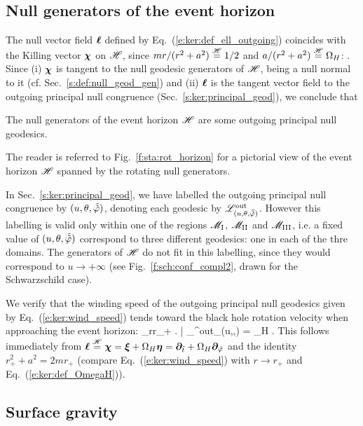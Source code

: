 \subsection{Null generators of the event horizon}

The null vector field $\bm{\ell}$ defined by Eq.~(\ref{e:ker:def_ell_outgoing}) coincides with the Killing vector $\bm{\chi}$ on $\mathscr{H}$,
since $m r/(r^2 + a^2) \stackrel{\mathscr{H}}{=} 1/2$ and $a/(r^2+a^2) \stackrel{\mathscr{H}}{=} \Omega_H$:
\be \label{e:ker:l_eqH_chi}
    \wl \equalH \w{\chi} .
\ee
Since (i) $\bm{\chi}$ is tangent
to the null geodesic generators of $\mathscr{H}$, being a null normal to it (cf. Sec.~\ref{s:def:null_geod_gen}) and (ii) $\bm{\ell}$ is the tangent vector field to the
outgoing principal null congruence (Sec.~\ref{s:ker:principal_geod}),
we conclude that
\begin{greybox}
The null generators of the event horizon $\mathscr{H}$ are some outgoing principal
null geodesics.
\end{greybox}
The reader is referred to Fig.~\ref{f:sta:rot_horizon} for a pictorial
view of the event horizon $\mathscr{H}$ spanned by the rotating null generators.

\begin{remark}
In Sec.~\ref{s:ker:principal_geod}, we have labelled the outgoing principal
null congruence by $(u,\theta,\tilde{{\tilde\varphi}})$, denoting each geodesic by
$\mathscr{L}^{\rm out}_{(u,\theta,\tilde{{\tilde\varphi}})}$. However this labelling is valid
only within one of the regions $\mathscr{M}_{\rm I}$, $\mathscr{M}_{\rm II}$ and
$\mathscr{M}_{\rm III}$, i.e. a fixed value of $(u,\theta,\tilde{{\tilde\varphi}})$
correspond to three different geodesics: one in each of the thre domains.
The generators of $\mathscr{H}$ do not fit in this labelling, since they would
correspond to $u\rightarrow +\infty$ (see Fig.~\ref{f:sch:conf_compl2}, drawn
for the Schwarzschild case).
\end{remark}


We verify that the winding speed of the outgoing principal
null geodesics given by Eq.~(\ref{e:ker:wind_speed}) tends toward
the black hole rotation velocity when approaching the event horizon:
\be
    \lim_{r\rightarrow r_+}
    \left. \frac{\D\tph}{\D\ti} \right| _{\Li^{\rm out}_{(u,\th,\tilde{\tph})}}
    = \Omega_H .
\ee
This follows immediately from
$\bm{\ell} \stackrel{\mathscr{H}}{=} \bm{\chi} = \bm{\xi} + \Omega_H \bm{\eta} = \bm{\partial}_{{\tilde t}}
    + \Omega_H \bm{\partial}_{{\tilde\varphi}} $
and the identity $r_+^2 + a^2 = 2 m r_+$ (compare Eq.~(\ref{e:ker:wind_speed})
with $r\rightarrow r_+$ and Eq.~(\ref{e:ker:def_OmegaH})).


\subsection{Surface gravity} \label{s:ker:surf_grav}

